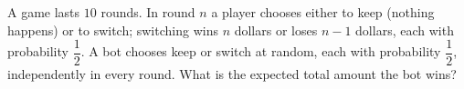 A game lasts $10$ rounds. In round $n$ a player chooses either to keep (nothing happens) or to switch; switching wins $n$ dollars or loses $n-1$ dollars, each with probability $\dfrac12$. A bot chooses keep or switch at random, each with probability $\dfrac12$, independently in every round. What is the expected total amount the bot wins?
